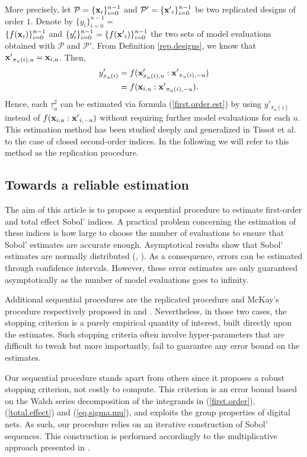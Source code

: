 More precisely, let $\mathcal{P}=\{\boldsymbol{\mathbf{x}}_i\}_{i=0}^{n-1}$ and $\mathcal{P}'=\{{\boldsymbol{\mathbf{x}}'}_i\}_{i=0}^{n-1}$ be two replicated designs of order $1$. Denote by $\{y_i\}_{i=0}^{n-1}=$\\$\{f(\boldsymbol{\mathbf{x}}_i)\}_{i=0}^{n-1}$ and $\{y'_i\}_{i=0}^{n-1}=\{f({\boldsymbol{\mathbf{x}}'}_i)\}_{i=0}^{n-1}$ the two sets of model evaluations obtained with $\mathcal{P}$ and $\mathcal{P}'$. From Definition \ref{rep.designs}, we know that ${\boldsymbol{\mathbf{x}}'}_{\pi_u(i),u}={\boldsymbol{\mathbf{x}}}_{i,u}$. Then,
\begin{align*}
y'_{\pi_u(i)}&= f(\boldsymbol{\mathbf{x}}'_{\pi_u(i),u}:{\boldsymbol{\mathbf{x}}'}_{\pi_u(i),-u}) \\
&= f(\boldsymbol{\mathbf{x}}_{i,u}:{\boldsymbol{\mathbf{x}}'}_{\pi_u(i),-u}).
\end{align*}
Hence, each $\underline{\tau}^2_u$ can be estimated via formula (\ref{first.order.est}) by using $y'_{\pi_u(i)}$ instead of $f(\boldsymbol{\mathbf{x}}_{i,u}:{\boldsymbol{\mathbf{x}}'}_{i,-u})$ without requiring further model evaluations for each $u$. This estimation method has been studied deeply and generalized in Tissot et al. \cite{Tissot} to the case of closed second-order indices. In the following we will refer to this method as the replication procedure.

\subsection{Towards a reliable estimation}
\label{sec:2.3}
The aim of this article is to propose a sequential procedure to estimate first-order and total effect Sobol' indices.  A practical problem concerning the estimation of these indices is how large to choose the number of evaluations to ensure that Sobol' estimates are accurate enough. Asymptotical results show that Sobol' estimates are normally distributed (\cite[Proposition 2.2]{Janon}, \cite[Proposition 3.5]{Tissot}). As a consequence, errors can be estimated through confidence intervals. However, these error estimates are only guaranteed asymptotically as the number of model evaluations goes to infinity.

Additional sequential procedures are the replicated procedure and McKay's procedure respectively proposed in \cite{Gilquin.rec} and \cite{Tong}. Nevertheless, in those two cases, the stopping criterion is a purely empirical quantity of interest, built directly upon the estimates. Such stopping criteria often involve hyper-parameters that are difficult to tweak but more importantly, fail to guarantee any error bound on the estimates. 

Our sequential procedure stands apart from others since it proposes a robust stopping criterion, not costly to compute. This criterion is an error bound based on the Walsh series decomposition of the integrands in (\ref{first.order}), (\ref{total.effect}) and (\ref{eq.sigma.mu}), and exploits the group properties of digital nets. As such, our procedure relies on an iterative construction of Sobol' sequences. This construction is performed accordingly to the multiplicative approach presented in \cite{GJAHMP}.

